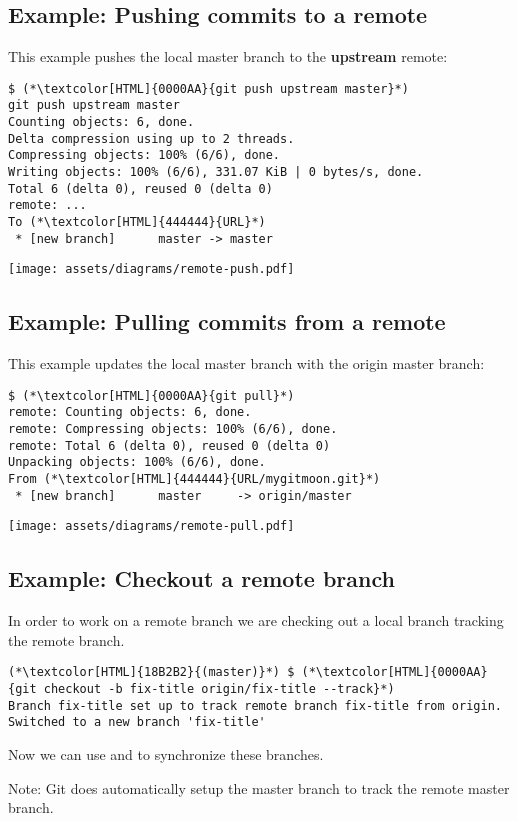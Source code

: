 \subsection{Example: Pushing commits to a remote}
\begin{frame}[fragile]
  \subslidetitle
  This example pushes the local master branch to the \textbf{upstream} remote:
  \begin{lstlisting}
$ (*\textcolor[HTML]{0000AA}{git push upstream master}*)
git push upstream master
Counting objects: 6, done.
Delta compression using up to 2 threads.
Compressing objects: 100% (6/6), done.
Writing objects: 100% (6/6), 331.07 KiB | 0 bytes/s, done.
Total 6 (delta 0), reused 0 (delta 0)
remote: ...
To (*\textcolor[HTML]{444444}{URL}*)
 * [new branch]      master -> master
\end{lstlisting}
\vspace{-1.1em}
\center \texttt{[image: assets/diagrams/remote-push.pdf]}
\end{frame}

\subsection{Example: Pulling commits from a remote}
\begin{frame}[fragile]
  \subslidetitle
  This example updates the local master branch with the origin master branch:
  \begin{lstlisting}
$ (*\textcolor[HTML]{0000AA}{git pull}*)
remote: Counting objects: 6, done.
remote: Compressing objects: 100% (6/6), done.
remote: Total 6 (delta 0), reused 0 (delta 0)
Unpacking objects: 100% (6/6), done.
From (*\textcolor[HTML]{444444}{URL/mygitmoon.git}*)
 * [new branch]      master     -> origin/master
\end{lstlisting}
\center \texttt{[image: assets/diagrams/remote-pull.pdf]}
\end{frame}

\subsection{Example: Checkout a remote branch}
\begin{frame}[fragile]
  \subslidetitle
  In order to work on a remote branch we are checking out a local branch tracking the remote branch.

  \begin{lstlisting}
(*\textcolor[HTML]{18B2B2}{(master)}*) $ (*\textcolor[HTML]{0000AA}{git checkout -b fix-title origin/fix-title --track}*)
Branch fix-title set up to track remote branch fix-title from origin.
Switched to a new branch 'fix-title'
\end{lstlisting}
  \vspace{1em}
  Now we can use  and  to synchronize these branches.

  \vspace{1em}
  Note: Git does automatically setup the master branch to track the remote master branch.
\end{frame}

